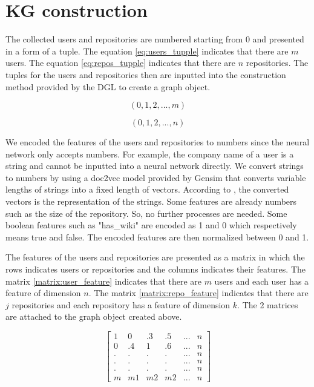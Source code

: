 \documentclass[11pt,twoside]{report}
\begin{document}
\section{KG construction}
The collected users and repositories are numbered starting from 0 and presented in a form of a tuple. The equation \ref{eq:users_tupple} indicates that there are $m$ users. The equation \ref{eq:repos_tupple} indicates that there are $n$ repositories. The tuples for the users and repositories then are inputted into the construction method provided by the DGL to create a graph object. 

\begin{equation}
    (0, 1, 2, ..., m)
    \label{eq:users_tupple}
\end{equation}

\begin{equation}
    (0, 1, 2, ..., n)
    \label{eq:repos_tupple}
\end{equation}

We encoded the features of the users and repositories to numbers since the neural network only accepts numbers. For example, the company name of a user is a string and cannot be inputted into a neural network directly. We convert strings to numbers by using a doc2vec model \cite{le_distributed_nodate} provided by Gensim \cite{rehurek_lrec} that converts variable lengths of strings into a fixed length of vectors. According to \cite{mikolov_efficient_2013}, the converted vectors is the representation of the strings. Some features are already numbers such as the size of the repository. So, no further processes are needed. Some boolean features such as "has\_wiki" are encoded as 1 and 0 which respectively means true and false. The encoded features are then normalized between 0 and 1.

The features of the users and repositories are presented as a matrix in which the rows indicates users or repositories and the columns indicates their features. The matrix \ref{matrix:user_feature} indicates that there are $m$ users and each user has a feature of dimension $n$. The matrix \ref{matrix:repo_feature} indicates that there are $j$ repositories and each repository has a feature of dimension $k$. The 2 matrices are attached to the graph object created above.

\begin{equation}
    \begin{bmatrix}
        1 & 0 & .3 & .5 & ... & n \\
        0 & .4 & 1 & .6 & ... & n \\
        . & . & . & . & ... & n \\
        . & . & . & . & ... & n \\
        . & . & . & . & ... & n \\
        m & m1 & m2 & m2 & ... & n
        \label{matrix:user_feature}
    \end{bmatrix}
\end{equation}
\end{document}
